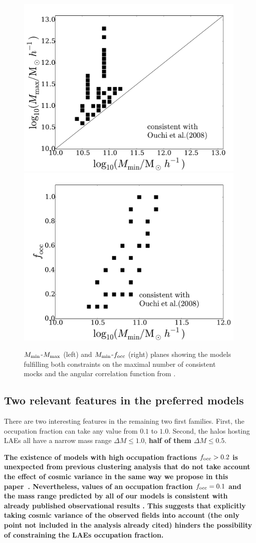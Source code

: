 \documentclass[usenatbib]{mn2e}
\newcommand{\documentname}{paper~}
\begin{document}
\begin{figure}
\begin{center}
\includegraphics[width=0.46\linewidth,angle=0]{Fig6_mass.pdf}
\hspace{5mm}
\includegraphics[width=0.46\linewidth,angle=0]{Fig6_f_occ.pdf}
\end{center}
\caption{$M_{\rm min}$-$M_{\rm max}$ (left) and $M_{\rm
    min}$-$f_{\rm occ}$ (right) planes showing the models fulfilling both
   constraints on the maximal number of consistent mocks and the
  angular correlation function from \citet{Ouchi2008,Ouchi2010}.   
  \label{fig:restriction_mock_and_f_occ_corr}} 
\end{figure} 


\subsection{Two relevant features in the preferred models}
There are two interesting features in the remaining two first
families. First, the occupation fraction can take any value from $0.1$
to $1.0$. Second, the halos hosting LAEs all have a narrow mass range
$\Delta M\leq 1.0$, {\bf half of them $\Delta M\leq 0.5$}.


{\bf The existence of models with high occupation fractions $f_{\rm
    occ}>0.2$ is unexpected from previous clustering analysis that do
  not take  account the effect of cosmic variance in the same way we
  propose in this \documentname. Nevertheless, values of an occupation
  fraction $f_{\rm occ}=0.1$ and the mass range
  predicted by all of our models is consistent with already published
  observational results \citep{Gawiser07,Ouchi2010}. This suggests
  that explicitly taking cosmic variance of the observed fields into
  account (the only point not included in the analysis already cited)
  hinders the possibility of constraining the LAEs occupation
  fraction.}   
\end{document}

